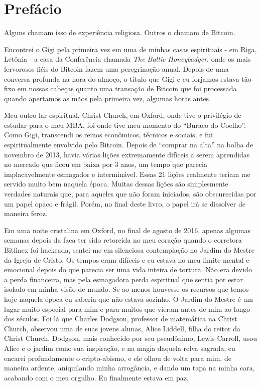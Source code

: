 \chapter*{Prefácio}

Alguns chamam isso de experiência religiosa. Outros o chamam de Bitcoin.

Encontrei o Gigi pela primeira vez em uma de minhas casas espirituais - em Riga, Letônia - a casa da Conferência chamada \textit{The Baltic Honeybadger}, onde os mais fervorosos fiéis do Bitcoin fazem uma peregrinação anual. Depois de uma conversa profunda na hora do almoço, o título que Gigi e eu forjamos estava tão fixo em nossas cabeças quanto uma transação de Bitcoin que foi processada quando apertamos as mãos pela primeira vez, algumas horas antes.

Meu outro lar espiritual, Christ Church, em Oxford, onde tive o privilégio de estudar para o meu MBA, foi onde tive meu momento do \enquote{Buraco do Coelho}. Como Gigi, transcendi os reinos econômicos, técnicos e sociais, e fui espiritualmente envolvido pelo Bitcoin. Depois de \enquote{comprar na alta} na bolha de novembro de 2013, havia várias lições extremamente difíceis a serem aprendidas no mercado que ficou em baixa por 3 anos, um tempo que parecia implacavelmente esmagador e interminável. Essas 21 lições realmente teriam me servido muito bem naquela época. Muitas dessas lições são simplesmente verdades naturais que, para aqueles que não foram iniciados, são obscurecidas por um papel opaco e frágil. Porém, no final deste livro, o papel irá se dissolver de maneira feroz.

Em uma noite cristalina em Oxford, no final de agosto de 2016, apenas algumas semanas depois da faca ter sido retorcida no meu coração quando o corretora Bitfinex foi hackeada, sentei-me em silenciosa contemplação no Jardim do Mestre da Igreja de Cristo. Os tempos eram difíceis e eu estava no meu limite mental e emocional depois do que parecia ser uma vida inteira de tortura. Não era devido a perda financeira, mas pela esmagadora perda espiritual que sentia por estar isolado em minha visão de mundo. Se ao menos houvesse os recursos que temos hoje naquela época eu saberia que não estava sozinho. O Jardim do Mestre é um lugar muito especial para mim e para muitos que vieram antes de mim ao longo dos séculos. Foi lá que Charles Dodgson, professor de matemática na Christ Church, observou uma de suas jovens alunas, Alice Liddell, filha do reitor da Christ Church. Dodgson, mais conhecido por seu pseudônimo, Lewis Carroll, usou Alice e o jardim como sua inspiração, e na magia daquela relva sagrada, eu encarei profundamente o cripto-abismo, e ele olhou de volta para mim, de maneira ardente, aniquilando minha arrogância, e dando um tapa na minha cara, acabando com o meu orgulho. Eu finalmente estava em paz.

